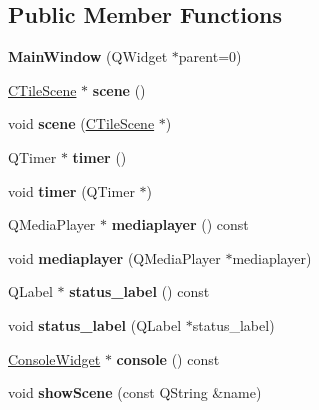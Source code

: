 \subsection*{Public Member Functions}
\begin{DoxyCompactItemize}
\item 
\mbox{\label{class_main_window_a8b244be8b7b7db1b08de2a2acb9409db}} 
{\bfseries Main\+Window} (Q\+Widget $\ast$parent=0)
\item 
\mbox{\label{class_main_window_a3fa3e92eb2c756bc7e7a73635ee088f0}} 
\hyperlink{class_c_tile_scene}{C\+Tile\+Scene} $\ast$ {\bfseries scene} ()
\item 
\mbox{\label{class_main_window_a1034123f9f086801209a881fe883d3a4}} 
void {\bfseries scene} (\hyperlink{class_c_tile_scene}{C\+Tile\+Scene} $\ast$)
\item 
\mbox{\label{class_main_window_ae9adbd9ad74d836628ff2950d503e397}} 
Q\+Timer $\ast$ {\bfseries timer} ()
\item 
\mbox{\label{class_main_window_a5ac9feeab611a5aafaa0191df82b4bf1}} 
void {\bfseries timer} (Q\+Timer $\ast$)
\item 
\mbox{\label{class_main_window_a6a897bf339db50a6209d6935b039f1a7}} 
Q\+Media\+Player $\ast$ {\bfseries mediaplayer} () const
\item 
\mbox{\label{class_main_window_aec13aad03609daadb5e54e2de86f1e08}} 
void {\bfseries mediaplayer} (Q\+Media\+Player $\ast$mediaplayer)
\item 
\mbox{\label{class_main_window_adb747cc217a5a2a077af79fe72c278cf}} 
Q\+Label $\ast$ {\bfseries status\+\_\+label} () const
\item 
\mbox{\label{class_main_window_a685d2e26a50d151d9ebd4fb0cc9f8aca}} 
void {\bfseries status\+\_\+label} (Q\+Label $\ast$status\+\_\+label)
\item 
\mbox{\label{class_main_window_a5f010205227b4aaf83f3874d5fbb08a0}} 
\hyperlink{class_console_widget}{Console\+Widget} $\ast$ {\bfseries console} () const
\item 
\mbox{\label{class_main_window_a1fabca5cc1f1f4f6a4a1cecec17aa822}} 
void {\bfseries show\+Scene} (const Q\+String \&name)
\end{DoxyCompactItemize}

